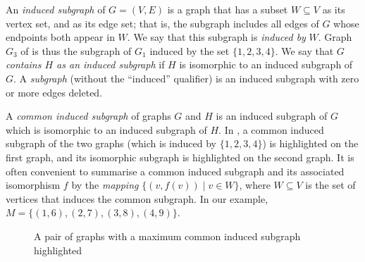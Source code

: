 An \emph{induced subgraph} of $G = (V, E)$ is a graph that has a subset $W \subseteq V$ as its
vertex set, and 
 as its edge set; that
is, the subgraph includes all edges of $G$ whose endpoints both appear in
$W$.  We say that this subgraph is \emph{induced by} $W$.
Graph $G_3$ of  is thus the subgraph
of $G_1$ induced by the set $\{1,2,3,4\}$.  We say that $G$ \emph{contains
$H$ as an induced subgraph} if $H$ is isomorphic to an induced subgraph of $G$.
A \emph{subgraph} (without the ``induced'' qualifier) is an induced subgraph
with zero or more edges deleted.

A \emph{common induced subgraph} of graphs $G$ and $H$ is an induced subgraph
of $G$ which is isomorphic to an induced subgraph of $H$. In
, a common induced subgraph of the two graphs (which is
induced by $\{1,2,3,4\}$) is highlighted on the first graph, and its isomorphic
subgraph is highlighted on the second graph.  It is often convenient to summarise
a common induced subgraph and its associated isomorphism $f$ by the \emph{mapping}
$\{(v,f(v)) \mid v \in W\}$, where $W \subseteq V$ is the set of vertices that
induces the common subgraph.  In our example, $M = \{(1,6), (2,7), (3,8), (4,9)\}$.

\begin{figure}[h!]
\centering
{}
\qquad
{}
\caption{A pair of graphs with a maximum common induced subgraph highlighted}
\label{fig:cis-example}
\end{figure}

